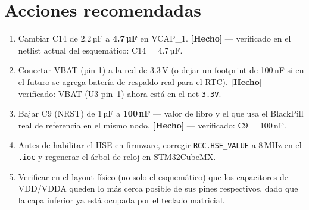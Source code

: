 \documentclass[11pt]{article}
\begin{document}
\section{Acciones recomendadas}

\begin{enumerate}
  \item Cambiar C14 de 2.2\,µF a \textbf{4.7\,µF} en VCAP\_1.
        \textcolor{okgreen}{\textbf{[Hecho]}} --- verificado en el netlist
        actual del esquemático: C14 = 4.7\,µF.
  \item Conectar VBAT (pin 1) a la red de 3.3\,V (o dejar un footprint de
        100\,nF si en el futuro se agrega batería de respaldo real para el
        RTC).
        \textcolor{okgreen}{\textbf{[Hecho]}} --- verificado: VBAT (U3
        pin~1) ahora está en el net \texttt{3.3V}.
  \item Bajar C9 (NRST) de 1\,µF a \textbf{100\,nF} — valor de libro y el que
        usa el BlackPill real de referencia en el mismo nodo.
        \textcolor{okgreen}{\textbf{[Hecho]}} --- verificado: C9 = 100\,nF.
  \item Antes de habilitar el HSE en firmware, corregir
        \texttt{RCC.HSE\_VALUE} a 8\,MHz en el \texttt{.ioc} y regenerar el
        árbol de reloj en STM32CubeMX.
  \item Verificar en el layout físico (no solo el esquemático) que los
        capacitores de VDD/VDDA queden lo más cerca posible de sus pines
        respectivos, dado que la capa inferior ya está ocupada por el
        teclado matricial.
\end{enumerate}
\end{document}
